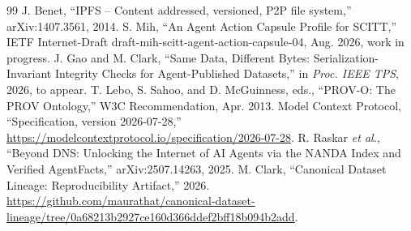 \documentclass[conference]{IEEEtran}
\begin{document}
\begin{thebibliography}{99}
 J. Benet, ``IPFS -- Content addressed, versioned, P2P file system,'' arXiv:1407.3561, 2014.
 S. Mih, ``An Agent Action Capsule Profile for SCITT,'' IETF Internet-Draft draft-mih-scitt-agent-action-capsule-04, Aug. 2026, work in progress.
 J. Gao and M. Clark, ``Same Data, Different Bytes: Serialization-Invariant Integrity Checks for Agent-Published Datasets,'' in \emph{Proc. IEEE TPS}, 2026, to appear.
 T. Lebo, S. Sahoo, and D. McGuinness, eds., ``PROV-O: The PROV Ontology,'' W3C Recommendation, Apr. 2013.
 Model Context Protocol, ``Specification, version 2026-07-28,'' \url{https://modelcontextprotocol.io/specification/2026-07-28}.
 R. Raskar \emph{et al.}, ``Beyond DNS: Unlocking the Internet of AI Agents via the NANDA Index and Verified AgentFacts,'' arXiv:2507.14263, 2025.
 M. Clark, ``Canonical Dataset Lineage: Reproducibility Artifact,'' 2026. \url{https://github.com/maurathat/canonical-dataset-lineage/tree/0a68213b2927ce160d366ddef2bff18b094b2add}.
\end{thebibliography}
\end{document}
